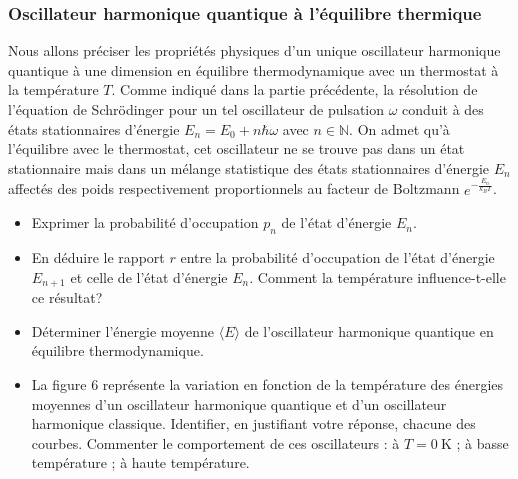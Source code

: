 \subsubsection*{Oscillateur harmonique quantique à l'équilibre thermique}


Nous allons préciser les propriétés physiques d'un unique oscillateur harmonique quantique à une dimension en équilibre thermodynamique avec un thermostat à la température $T$. Comme indiqué dans la partie précédente, la résolution de l'équation de Schrödinger pour un tel oscillateur de pulsation $\omega$ conduit à des états stationnaires d'énergie $E_n=E_0+n \hbar \omega$ avec $n \in \mathbb{N}$.
On admet qu'à l'équilibre avec le thermostat, cet oscillateur ne se trouve pas dans un état stationnaire mais dans un mélange statistique des états stationnaires d'énergie $E_n$ affectés des poids respectivement proportionnels au facteur de Boltzmann $e^{-\frac{E_n}{k_B T}}$.
\begin{itemize}
\item[\textbf{II.B.1}] \facile Exprimer la probabilité d'occupation $p_n$ de l'état d'énergie $E_n$.
\item[\textbf{II.B.2}] \facile En déduire le rapport $r$ entre la probabilité d'occupation de l'état d'énergie $E_{n+1}$ et celle de l'état d'énergie $E_n$. Comment la température influence-t-elle ce résultat?
\item[\textbf{II.B.3}] \moyen Déterminer l'énergie moyenne $\langle E\rangle$ de l'oscillateur harmonique quantique en équilibre thermodynamique.
\item[\textbf{II.B.4}] \moyen La figure 6 représente la variation en fonction de la température des énergies moyennes d'un oscillateur harmonique quantique et d'un oscillateur harmonique classique. Identifier, en justifiant votre réponse, chacune des courbes. Commenter le comportement de ces oscillateurs : à $T=0 \mathrm{~K}$ ; à basse température ; à haute température.
\end{itemize}

\begin{figure}[h]
\begin{center}
\end{center}
\end{figure}




